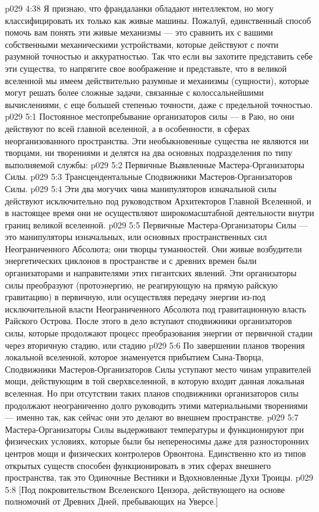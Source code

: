 \vs p029 4:38 Я признаю, что франдаланки обладают интеллектом, но могу классифицировать их только как живые машины. Пожалуй, единственный способ помочь вам понять эти живые механизмы --- это сравнить их с вашими собственными механическими устройствами, которые действуют с почти разумной точностью и аккуратностью. Так что если вы захотите представить себе эти существа, то напрягите свое воображение и представьте, что в великой вселенной мы имеем действительно разумные и  механизмы (сущности), которые могут решать более сложные задачи, связанные с колоссальнейшими вычислениями, с еще большей степенью точности, даже с предельной точностью.
\vs p029 5:1 Постоянное местопребывание организаторов силы --- в Раю, но они действуют по всей главной вселенной, а в особенности, в сферах неорганизованного пространства. Эти необыкновенные существа не являются ни творцами, ни творениями и делятся на два основных подразделения по типу выполняемой службы:
\vs p029 5:2 \bibnobreakspace Первичные Выявленные Мастера\hyp{}Организаторы Силы.
\vs p029 5:3 \bibnobreakspace Трансцендентальные Сподвижники Мастеров\hyp{}Организаторов Силы.
\vs p029 5:4 \pc Эти два могучих чина манипуляторов изначальной силы действуют исключительно под руководством Архитекторов Главной Вселенной, и в настоящее время они не осуществляют широкомасштабной деятельности внутри границ великой вселенной.
\vs p029 5:5 \pc Первичные Мастера\hyp{}Организаторы Силы --- это манипуляторы изначальных, или основных пространственных сил Неограниченного Абсолюта; они творцы туманностей. Они живые возбудители энергетических циклонов в пространстве и с древних времен были организаторами и направителями этих гигантских явлений. Эти организаторы силы преобразуют  (протоэнергию, не реагирующую на прямую райскую гравитацию) в первичную, или  осуществляя передачу энергии из\hyp{}под исключительной власти Неограниченного Абсолюта под гравитационную власть Райского Острова. После этого в дело вступают сподвижники организаторов силы, которые продолжают процесс преобразования энергии от первичной стадии через вторичную стадию, или стадию 
\vs p029 5:6 По завершении планов творения локальной вселенной, которое знаменуется прибытием Сына\hyp{}Творца, Сподвижники Мастеров\hyp{}Организаторов Силы уступают место чинам управителей мощи, действующим в той сверхвселенной, в которую входит данная локальная вселенная. Но при отсутствии таких планов сподвижники организаторов силы продолжают неограниченно долго руководить этими материальными творениями --- именно так, как сейчас они это делают во внешнем пространстве.
\vs p029 5:7 Мастера\hyp{}Организаторы Силы выдерживают температуры и функционируют при физических условиях, которые были бы непереносимы даже для разносторонних центров мощи и физических контролеров Орвонтона. Единственно кто из типов открытых существ способен функционировать в этих сферах внешнего пространства, так это Одиночные Вестники и Вдохновленные Духи Троицы.
\vsetoff
\vs p029 5:8 [Под покровительством Вселенского Цензора, действующего на основе полномочий от Древних Дней, пребывающих на Уверсе.]

